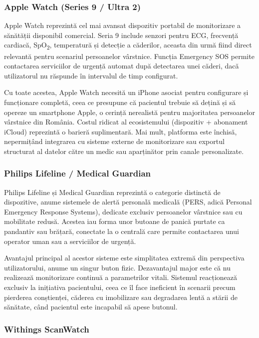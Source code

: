\documentclass[12pt,a4paper,twoside]{article}
\newcommand{\spo}{SpO\textsubscript{2}}
\begin{document}
\subsubsection{Apple Watch (Series 9 / Ultra 2)}

Apple Watch reprezintă cel mai avansat dispozitiv portabil de monitorizare a sănătății disponibil comercial. Seria 9 include senzori pentru ECG, frecvență cardiacă, \spo, temperatură și detecție a căderilor, aceasta din urmă fiind direct relevantă pentru scenariul persoanelor vârstnice. Funcția Emergency SOS permite contactarea serviciilor de urgență automat după detectarea unei căderi, dacă utilizatorul nu răspunde în intervalul de timp configurat.

Cu toate acestea, Apple Watch necesită un iPhone asociat pentru configurare și funcționare completă, ceea ce presupune că pacientul trebuie să dețină și să opereze un smartphone Apple, o cerință nerealistă pentru majoritatea persoanelor vârstnice din România. Costul ridicat al ecosistemului (dispozitiv + abonament iCloud) reprezintă o barieră suplimentară. Mai mult, platforma este închisă, nepermițând integrarea cu sisteme externe de monitorizare sau exportul structurat al datelor către un medic sau aparținător prin canale personalizate.

\subsubsection{Philips Lifeline / Medical Guardian}

Philips Lifeline și Medical Guardian reprezintă o categorie distinctă de dispozitive, anume sistemele de alertă personală medicală (PERS, adică Personal Emergency Response Systems), dedicate exclusiv persoanelor vârstnice sau cu mobilitate redusă. Acestea iau forma unor butoane de panică purtate ca pandantiv sau brățară, conectate la o centrală care permite contactarea unui operator uman sau a serviciilor de urgență.

Avantajul principal al acestor sisteme este simplitatea extremă din perspectiva utilizatorului, anume un singur buton fizic. Dezavantajul major este că nu realizează monitorizare continuă a parametrilor vitali. Sistemul reacționează exclusiv la inițiativa pacientului, ceea ce îl face ineficient în scenarii precum pierderea conștienței, căderea cu imobilizare sau degradarea lentă a stării de sănătate, când pacientul este incapabil să apese butonul.

\subsubsection{Withings ScanWatch}
\end{document}
